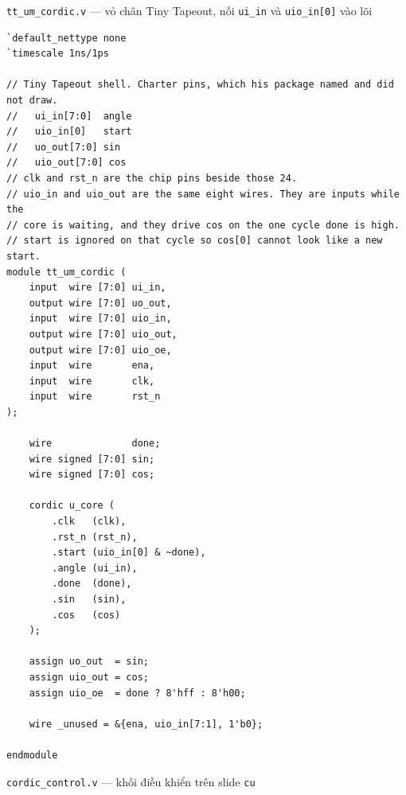 \documentclass[12pt,a4paper]{article}
\begin{document}
\noindent\texttt{tt\_um\_cordic.v} — vỏ chân Tiny Tapeout, nối \texttt{ui\_in} và \texttt{uio\_in[0]} vào lõi

\begin{verbatim}
`default_nettype none
`timescale 1ns/1ps

// Tiny Tapeout shell. Charter pins, which his package named and did not draw.
//   ui_in[7:0]  angle
//   uio_in[0]   start
//   uo_out[7:0] sin
//   uio_out[7:0] cos
// clk and rst_n are the chip pins beside those 24.
// uio_in and uio_out are the same eight wires. They are inputs while the
// core is waiting, and they drive cos on the one cycle done is high.
// start is ignored on that cycle so cos[0] cannot look like a new start.
module tt_um_cordic (
    input  wire [7:0] ui_in,
    output wire [7:0] uo_out,
    input  wire [7:0] uio_in,
    output wire [7:0] uio_out,
    output wire [7:0] uio_oe,
    input  wire       ena,
    input  wire       clk,
    input  wire       rst_n
);

    wire              done;
    wire signed [7:0] sin;
    wire signed [7:0] cos;

    cordic u_core (
        .clk   (clk),
        .rst_n (rst_n),
        .start (uio_in[0] & ~done),
        .angle (ui_in),
        .done  (done),
        .sin   (sin),
        .cos   (cos)
    );

    assign uo_out  = sin;
    assign uio_out = cos;
    assign uio_oe  = done ? 8'hff : 8'h00;

    wire _unused = &{ena, uio_in[7:1], 1'b0};

endmodule
\end{verbatim}

\noindent\texttt{cordic\_control.v} — khối điều khiển trên slide \texttt{cu}
\end{document}
